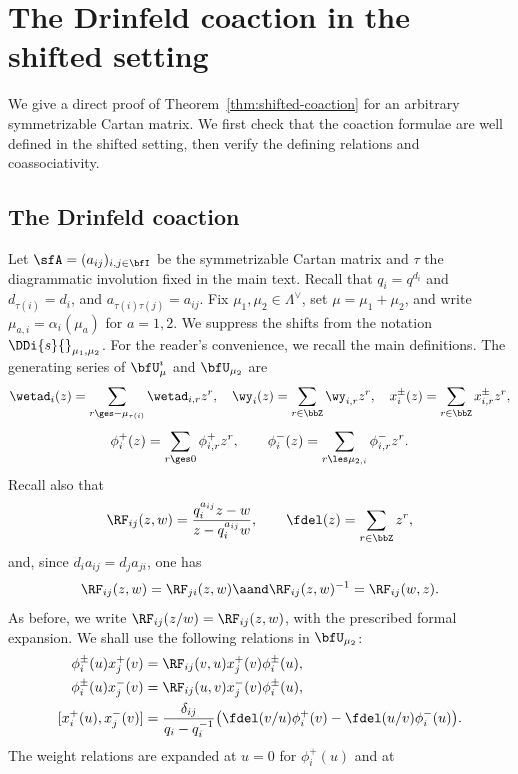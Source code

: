 \documentclass[reqno]{amsart}
\numberwithin{equation}{section}
\begin{document}
\appendix
\renewcommand{\endpf}{\qed\par\medskip}
\section{The Drinfeld coaction in the shifted setting}
\label{app:shifted-coaction}
We give a direct proof of Theorem~\ref{thm:shifted-coaction} for an arbitrary 
symmetrizable Cartan matrix. We first check that the coaction formulae are well defined 
in the shifted setting, then verify the defining relations and coassociativity.

\subsection{The Drinfeld coaction}
Let $\sfA=(a_{ij})_{i,j\in\bfI}$ be the symmetrizable Cartan matrix and $\tau$ 
the diagrammatic involution fixed in the main text. Recall that $q_i=q^{d_i}$ and
$d_{\tau(i)}=d_i$, and $a_{\tau(i)\tau(j)}=a_{ij}$.
Fix $\mu_1,\mu_2\in\Lambda^\vee$, set $\mu=\mu_1+\mu_2$, and write 
$\mu_{a,i}=\alpha_i(\mu_a)$ for $a=1,2$. We suppress the shifts from the notation 
$\DDi{s}{}_{\mu_1,\mu_2}$.
For the reader's convenience, we recall the main definitions.
The generating series of $\bfU^\imath_\mu$ and $\bfU_{\mu_2}$ are
\[
\wetad_i(z)=\sum_{r\ges-\mu_{\tau(i)}}\wetad_{i,r}z^r,\quad
\wy_i(z)=\sum_{r\in\bbZ}\wy_{i,r}z^r,\quad
x_i^\pm(z)=\sum_{r\in\bbZ}x_{i,r}^\pm z^r,
\]
\[
\phi_i^+(z)=\sum_{r\ges0}\phi_{i,r}^+z^r,\qquad
\phi_i^-(z)=\sum_{r\les\mu_{2,i}}\phi_{i,r}^-z^r.
\]
Recall also that
\[
\RF_{ij}(z,w)=\frac{q_i^{a_{ij}}z-w}{z-q_i^{a_{ij}}w},
\qquad
\fdel(z)=\sum_{r\in\bbZ}z^r,
\]
and, since $d_i a_{ij}=d_j a_{ji}$, one has
\[
\RF_{ij}(z,w)=\RF_{ji}(z,w)
\aand
\RF_{ij}(z,w)^{-1}=\RF_{ij}(w,z).
\]
As before, we write $\RF_{ij}(z/w)=\RF_{ij}(z,w)$, with the prescribed formal expansion.
We shall use the following relations in $\bfU_{\mu_2}$:
\begin{align}
	\phi_i^\pm(u)x_j^+(v)&=\RF_{ij}(v,u)x_j^+(v)\phi_i^\pm(u),\label{app:phi-x-plus}\\
	\phi_i^\pm(u)x_j^-(v)&=\RF_{ij}(u,v)x_j^-(v)\phi_i^\pm(u),\label{app:phi-x-minus}\\
	[x_i^+(u),x_j^-(v)]&=\frac{\delta_{ij}}{q_i-q_i^{-1}}
	\bigl(\fdel(v/u)\phi_i^+(v)-\fdel(u/v)\phi_i^-(u)\bigr).
	\label{app:mixed-current}
\end{align}
The weight relations are expanded at $u=0$ for $\phi_i^+(u)$ and at
\end{document}
